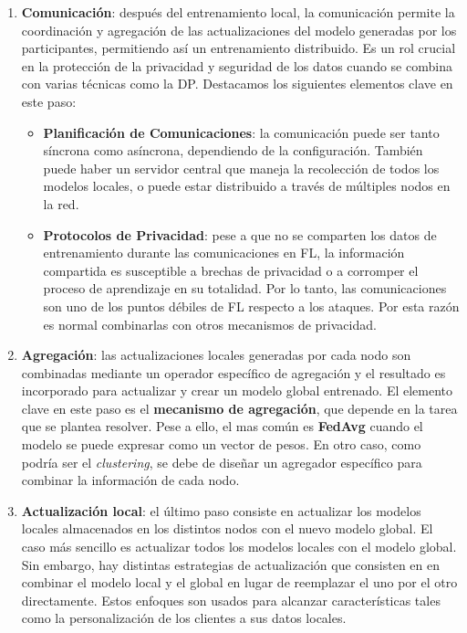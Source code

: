 \begin{enumerate}
    \item \textbf{Comunicación}: después del entrenamiento local, la comunicación permite la coordinación y agregación de las actualizaciones del modelo generadas por los participantes, permitiendo así un entrenamiento distribuido. Es un rol crucial en la protección de la privacidad y seguridad de los datos cuando se combina con varias técnicas como la \ac{DP}. Destacamos los siguientes elementos clave en este paso:
    \begin{itemize}
        \item \textbf{Planificación de Comunicaciones}: la comunicación puede ser tanto síncrona como asíncrona, dependiendo de la configuración. También puede haber un servidor central que maneja la recolección de todos los modelos locales, o puede estar distribuido a través de múltiples nodos en la red.

        \item \textbf{Protocolos de Privacidad}: pese a que no se comparten los datos de entrenamiento durante las comunicaciones en \ac{FL}, la información compartida es susceptible a brechas de privacidad o a corromper el proceso de aprendizaje en su totalidad. Por lo tanto, las comunicaciones son uno de los puntos débiles de \ac{FL} respecto a los ataques. Por esta razón es normal combinarlas con otros mecanismos de privacidad.
    \end{itemize}

    \item \textbf{Agregación}: las actualizaciones locales generadas por cada nodo son combinadas mediante un operador específico de agregación y el resultado es incorporado para actualizar y crear un modelo global entrenado. El elemento clave en este paso es el \textbf{mecanismo de agregación}, que depende en la tarea que se plantea resolver. Pese a ello, el mas común es \textbf{\ac{FedAvg}} cuando el modelo se puede expresar como un vector de pesos. En otro caso, como podría ser el \textit{clustering}, se debe de diseñar un agregador específico para combinar la información de cada nodo.
    \item \textbf{Actualización local}: el último paso consiste en actualizar los modelos locales almacenados en los distintos nodos con el nuevo modelo global. El caso más sencillo es actualizar todos los modelos locales con el modelo global. Sin embargo, hay distintas estrategias de actualización que consisten en en combinar el modelo local y el global en lugar de reemplazar el uno por el otro directamente. Estos enfoques son usados para alcanzar características tales como la personalización de los clientes a sus datos locales.
\end{enumerate}

